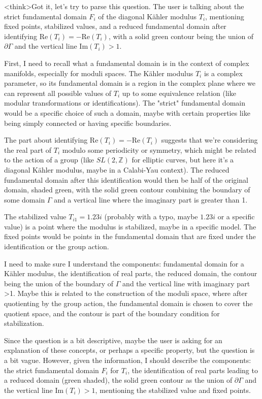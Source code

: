 <think>Got it, let's try to parse this question. The user is talking about the strict fundamental domain \( F_i \) of the diagonal Kähler modulus \( T_i \), mentioning fixed points, stabilized values, and a reduced fundamental domain after identifying \( \text{Re}(T_i) = -\text{Re}(T_i) \), with a solid green contour being the union of \( \partial\Gamma \) and the vertical line \( \text{Im}(T_i) > 1 \). 

First, I need to recall what a fundamental domain is in the context of complex manifolds, especially for moduli spaces. The Kähler modulus \( T_i \) is a complex parameter, so its fundamental domain is a region in the complex plane where we can represent all possible values of \( T_i \) up to some equivalence relation (like modular transformations or identifications). The "strict" fundamental domain would be a specific choice of such a domain, maybe with certain properties like being simply connected or having specific boundaries.

The part about identifying \( \text{Re}(T_i) = -\text{Re}(T_i) \) suggests that we're considering the real part of \( T_i \) modulo some periodicity or symmetry, which might be related to the action of a group (like \( SL(2,\mathbb{Z}) \) for elliptic curves, but here it's a diagonal Kähler modulus, maybe in a Calabi-Yau context). The reduced fundamental domain after this identification would then be half of the original domain, shaded green, with the solid green contour combining the boundary of some domain \( \Gamma \) and a vertical line where the imaginary part is greater than 1.

The stabilized value \( T_{i1} = 1.23i \) (probably with a typo, maybe \( 1.23i \) or a specific value) is a point where the modulus is stabilized, maybe in a specific model. The fixed points would be points in the fundamental domain that are fixed under the identification or the group action.

I need to make sure I understand the components: fundamental domain for a Kähler modulus, the identification of real parts, the reduced domain, the contour being the union of the boundary of \( \Gamma \) and the vertical line with imaginary part >1. Maybe this is related to the construction of the moduli space, where after quotienting by the group action, the fundamental domain is chosen to cover the quotient space, and the contour is part of the boundary condition for stabilization.

Since the question is a bit descriptive, maybe the user is asking for an explanation of these concepts, or perhaps a specific property, but the question is a bit vague. However, given the information, I should describe the components: the strict fundamental domain \( F_i \) for \( T_i \), the identification of real parts leading to a reduced domain (green shaded), the solid green contour as the union of \( \partial\Gamma \) and the vertical line \( \text{Im}(T_i) > 1 \), mentioning the stabilized value and fixed points.

